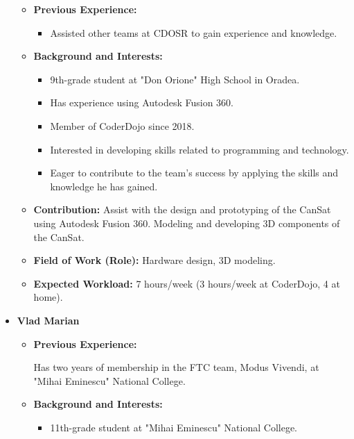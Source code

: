 \documentclass[11pt]{article}
\begin{document}
\begin{itemize}
\begin{itemize}[label=]
        \item[\faCogs] \textbf{Previous Experience:} 
        \begin{itemize}[label=]
            \item Assisted other teams at CDOSR to gain experience and knowledge.
        \end{itemize}
        \item[\faGraduationCap] \textbf{Background and Interests:} 
        \begin{itemize}[label=]
            \item 9th-grade student at "Don Orione" High School in Oradea.
            \item Has experience using Autodesk Fusion 360.
            \item Member of CoderDojo since 2018.
            \item Interested in developing skills related to programming and technology.
            \item Eager to contribute to the team's success by applying the skills and knowledge he has gained.
        \end{itemize}
        \item[\faEdit] \textbf{Contribution:} Assist with the design and prototyping of the CanSat using Autodesk Fusion 360. Modeling and developing 3D components of the CanSat.
        \item[\faMicroscope] \textbf{Field of Work (Role):} Hardware design, 3D modeling.
        \item[\faLaptopCode] \textbf{Expected Workload:} 7 hours/week (3 hours/week at CoderDojo, 4 at home).
    \end{itemize}
    \vspace{0.2 cm}
    \item[] \textbf{Vlad Marian}
    \begin{itemize}[label=]
        \item[\faCogs] \textbf{Previous Experience:} 
        \begin{itemize}[label=]
            \myitemtwo Has two years of membership in the FTC team, Modus Vivendi, at "Mihai Eminescu" National College.
        \end{itemize}
        \item[\faGraduationCap] \textbf{Background and Interests:} 
        \begin{itemize}[label=]
            \item 11th-grade student at "Mihai Eminescu" National College.

\end{itemize}
\end{itemize}
\end{itemize}
\end{document}
